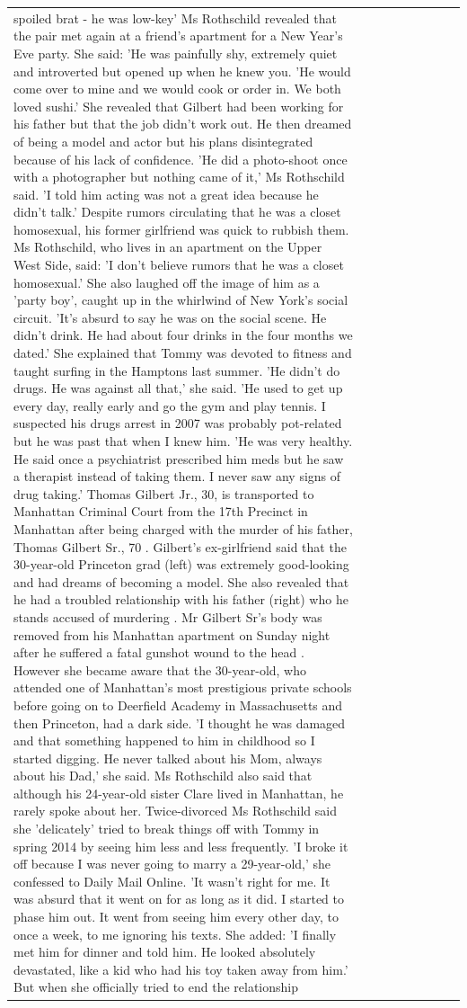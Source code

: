 \begin{table}[H]
\begin{tabular}{lllrlllll}
spoiled brat - he was low-key' Ms Rothschild revealed that the pair met again at a friend’s apartment for a New Year’s Eve party. She said: 'He was painfully shy, extremely quiet and introverted but opened up when he knew you. 'He would come over to mine and we would cook or order in. We both loved sushi.' She revealed that Gilbert had been working for his father but that the job didn't work out. He then dreamed of being a model and actor but his plans disintegrated because of his lack of confidence. 'He did a photo-shoot once with a photographer but nothing came of it,' Ms Rothschild said. 'I told him acting was not a great idea because he didn’t talk.' Despite rumors circulating that he was a closet homosexual, his former girlfriend was quick to rubbish them. Ms Rothschild, who lives in an apartment on the Upper West Side, said: 'I don’t believe rumors that he was a closet homosexual.' She also laughed off the image of him as a 'party boy', caught up in the whirlwind of New York's social circuit. 'It’s absurd to say he was on the social scene. He didn’t drink. He had about four drinks in the four months we dated.' She explained that Tommy was devoted to fitness and taught surfing in the Hamptons last summer. 'He didn’t do drugs. He was against all that,' she said. 'He used to get up every day, really early and go the gym and play tennis. I suspected his drugs arrest in 2007 was probably pot-related but he was past that when I knew him. 'He was very healthy. He said once a psychiatrist prescribed him meds but he saw a therapist instead of taking them. I never saw any signs of drug taking.' Thomas Gilbert Jr., 30, is transported to Manhattan Criminal Court from the 17th Precinct in Manhattan after being charged with the murder of his father, Thomas Gilbert Sr., 70 . Gilbert's ex-girlfriend said that the 30-year-old Princeton grad (left) was extremely good-looking and had dreams of becoming a model. She also revealed that he had a troubled relationship with his father (right) who he stands accused of murdering . Mr Gilbert Sr's body was removed from his Manhattan apartment on Sunday night after he suffered a fatal gunshot wound to the head . However she became aware that the 30-year-old, who attended one of Manhattan's most prestigious private schools before going on to Deerfield Academy in Massachusetts and then Princeton, had a dark side. 'I thought he was damaged and that something happened to him in childhood so I started digging. He never talked about his Mom, always about his Dad,' she said. Ms Rothschild also said that although his 24-year-old sister Clare lived in Manhattan, he rarely spoke about her. Twice-divorced Ms Rothschild said she 'delicately' tried to break things off with Tommy in spring 2014 by seeing him less and less frequently. 'I broke it off because I was never going to marry a 29-year-old,' she confessed to Daily Mail Online. 'It wasn’t right for me. It was absurd that it went on for as long as it did. I started to phase him out. It went from seeing him every other day, to once a week, to me ignoring his texts. She added: 'I finally met him for dinner and told him. He looked absolutely devastated, like a kid who had his toy taken away from him.' But when she officially tried to end the relationship 
\end{tabular}
\end{table}
